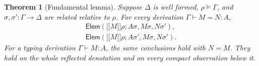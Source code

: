 \documentclass[11pt,a4paper]{article}
\newtheorem{theorem}{Theorem}[section]
\theoremstyle{definition}
\theoremstyle{remark}
\newcommand{\ev}[1]{\mathopen{[\![}#1\mathclose{]\!]}}
\newcommand{\ElemRel}{\mathsf{Elem}}
\begin{document}
\begin{theorem}[Fundamental lemma]\label{thm:fundamental}
Suppose $\Delta$ is well formed, $\rho\models\Gamma$, and
$\sigma,\sigma':\Gamma\to\Delta$ are related relative to $\rho$.
For every derivation $\Gamma\vdash M=N:A$,
\begin{equation}\label{eq:fundamental}
\begin{aligned}
 \ElemRel(\ev M\rho;A\sigma,M\sigma,N\sigma'),\\
 \ElemRel(\ev M\rho;A\sigma',M\sigma,N\sigma').
\end{aligned}
\end{equation}
For a typing derivation $\Gamma\vdash M:A$, the same conclusions hold
with $N=M$. They hold on the whole reflected denotation and on every
compact observation below it.
\end{theorem}
\end{document}
